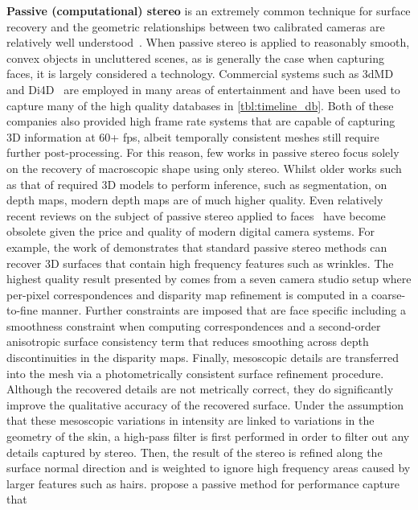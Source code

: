 \textbf{Passive (computational) stereo} is an extremely common technique for
surface recovery and the geometric relationships between two calibrated cameras
are relatively well
understood~\cite{barnard1982computational,seitz2006comparison}. When passive
stereo is applied to reasonably smooth, convex objects in uncluttered scenes, as
is generally the case when capturing faces, it is largely considered a
technology. Commercial systems such as 3dMD~\cite{3dmd} and Di4D~\cite{di4d} are
employed in many areas of entertainment and have been used to capture many of
the high quality databases in \cref{tbl:timeline_db}. Both of these companies
also provided high frame rate systems that are capable of capturing 3D
information at 60+ fps, albeit temporally consistent meshes still require
further post-processing. For this reason, few works in passive stereo focus
solely on the recovery of macroscopic shape using only stereo. Whilst older
works such as that of \citet{Lengagne:1996ej} required 3D models to perform
inference, such as segmentation, on depth maps, modern depth maps are of much
higher quality. Even relatively recent reviews on the subject of passive stereo
applied to faces~\cite{Leclercq:2005ee} have become obsolete given the price and
quality of modern digital camera systems. For example, the work of
\citet{Beeler:2010dg} demonstrates that standard passive stereo methods can
recover 3D surfaces that contain high frequency features such as wrinkles.
The highest quality result presented by \citet{Beeler:2010dg} comes from a seven
camera studio setup where per-pixel correspondences and disparity map refinement
is computed in a coarse-to-fine manner. Further constraints are imposed that are
face specific including a smoothness constraint when computing correspondences
and a second-order anisotropic surface consistency term that reduces smoothing
across depth discontinuities in the disparity maps. Finally, mesoscopic details
are transferred into the mesh via a photometrically consistent surface
refinement procedure. Although the recovered details are not metrically correct,
they do significantly improve the qualitative accuracy of the recovered surface.
Under the assumption that these mesoscopic variations in intensity are linked to
variations in the geometry of the skin, a high-pass filter is first performed in
order to filter out any details captured by stereo. Then, the result of the
stereo is refined along the surface normal direction and is weighted to ignore
high frequency areas caused by larger features such as hairs.
\citet{bradley2010high} propose a passive method for performance capture that

